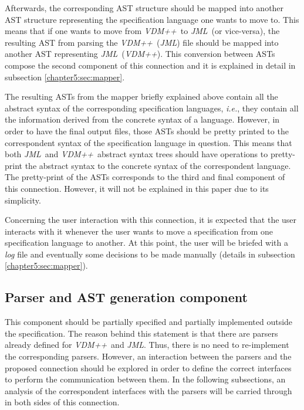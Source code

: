 \documentclass{llncs}
\newcommand{\jml}{\textit{JML}}
\newcommand{\vpp}{\textit{VDM++}}
\newcommand{\ie}{\textit{i.e.}}
\begin{document}
Afterwards, the corresponding AST structure should be mapped into another AST structure representing the specification language one wants to move to. This means that if one wants to move from \vpp\ to \jml\ (or vice-versa), the resulting AST from parsing the \vpp\ (\jml) file should be mapped into another AST representing \jml\ (\vpp). This conversion between ASTs compose the second component of this connection and it is explained in detail in subsection \ref{chapter5:sec:mapper}.

The resulting ASTs from the mapper briefly explained above contain all the abstract syntax of the corresponding specification languages, \ie, they contain all the information derived from the concrete syntax of a language. However, in order to have the final output files, those ASTs should be pretty printed to the correspondent syntax of the specification language in question. This means that both \jml\ and \vpp\ abstract syntax trees should have operations to pretty-print the abstract syntax to the concrete syntax of the correspondent language. The pretty-print of the ASTs corresponds to the third and final component of this connection. However, it will not be explained in this paper due to its simplicity. 

Concerning the user interaction with this connection, it is expected that the user interacts with it whenever the user wants to move a specification from one specification language to another. At this point, the user will be briefed with a \textit{log} file and eventually some decisions to be made manually (details in subsection \ref{chapter5:sec:mapper}).

\subsection{Parser and AST generation component}
\label{sec:component1}

This component should be partially specified and partially implemented outside the specification. The reason behind this statement is that there are parsers already defined for \vpp\ and \jml. Thus, there is no need to re-implement the corresponding parsers. However, an interaction between the parsers and the proposed connection should be explored in order to define the correct interfaces to perform the communication between them. In the following subsections, an analysis of the correspondent interfaces with the parsers will be carried through in both sides of this connection.
\end{document}
